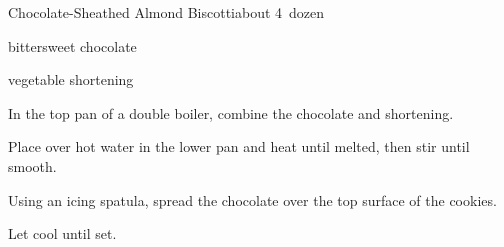 \begin{recipe}{Chocolate-Sheathed Almond Biscotti}{}{about 4\half\ dozen}

\begin{ingredients}
\item {} bittersweet chocolate
\item \tp{\half} vegetable shortening
\end{ingredients}

\begin{directions}
\item In the top pan of a double boiler, combine the chocolate and shortening.
\item Place over hot water in the lower pan and heat until melted, then stir until smooth.
\item Using an icing spatula, spread the chocolate over the top surface of the cookies.
\item Let cool until set.
\end{directions}

\end{recipe}
